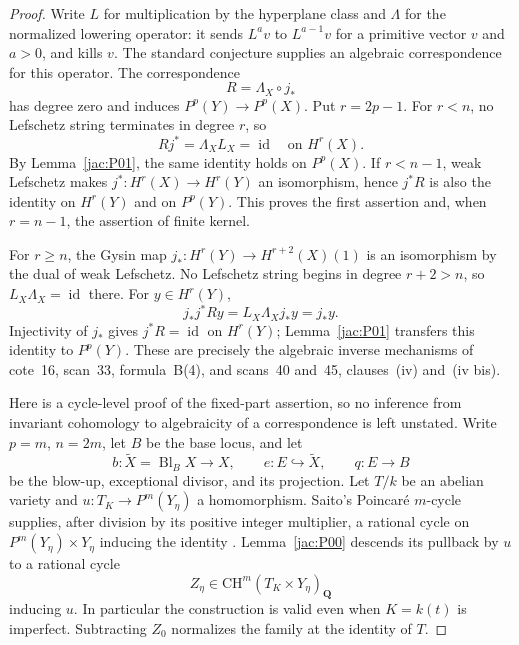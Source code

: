 \begin{proof}
Write $L$ for multiplication by the hyperplane class and $\Lambda$
for the normalized lowering operator: it sends $L^a v$ to
$L^{a-1}v$ for a primitive vector $v$ and $a>0$, and kills $v$.
The standard conjecture supplies an algebraic correspondence for this
operator.  The correspondence
\[
 R=\Lambda_X\circ j_*
\]
has degree zero and induces $P^p(Y)\to P^p(X)$.
Put $r=2p-1$.
For $r<n$, no Lefschetz string terminates in degree $r$, so
\[
 Rj^*=\Lambda_X L_X=\operatorname{id}\quad\text{on }H^r(X).
\]
By Lemma~\ref{jac:P01}, the same identity holds on $P^p(X)$.
If $r<n-1$, weak Lefschetz makes $j^*:H^r(X)\to H^r(Y)$ an
isomorphism, hence $j^*R$ is also the identity on $H^r(Y)$ and on
$P^p(Y)$.  This proves the first assertion and, when $r=n-1$,
the assertion of finite kernel.

For $r\ge n$, the Gysin map
$j_*:H^r(Y)\to H^{r+2}(X)(1)$ is an isomorphism by the dual of
weak Lefschetz.  No Lefschetz string begins in degree $r+2>n$,
so $L_X\Lambda_X=\operatorname{id}$ there.  For $y\in H^r(Y)$,
\[
 j_*j^*Ry=L_X\Lambda_Xj_*y=j_*y.
\]
Injectivity of $j_*$ gives $j^*R=\operatorname{id}$ on $H^r(Y)$;
Lemma~\ref{jac:P01} transfers this identity to $P^p(Y)$.
These are precisely the algebraic inverse mechanisms of cote~16,
scan~33, formula~B(4), and scans~40 and~45, clauses~(iv) and~(iv bis).

Here is a cycle-level proof of the fixed-part assertion, so no inference
from invariant cohomology to algebraicity of a correspondence is left
unstated.  Write $p=m$, $n=2m$, let $B$ be the base locus, and let
\[
 b:\widetilde X=\operatorname{Bl}_B X\longrightarrow X,
 \qquad e:E\hookrightarrow\widetilde X,
 \qquad q:E\longrightarrow B
\]
be the blow-up, exceptional divisor, and its projection.  Let $T/k$
be an abelian variety and
$u:T_K\longrightarrow P^m(Y_\eta)$ a homomorphism.  Saito's
Poincar\'e $m$-cycle supplies, after division by its positive integer
multiplier, a rational cycle on $P^m(Y_\eta)\times Y_\eta$
inducing the identity \cite[\S4.1]{Saito1979}.  Lemma~\ref{jac:P00}
descends its pullback by $u$ to a rational cycle
\[
 Z_\eta\in\mathrm{CH}^m(T_K\times Y_\eta)_{\mathbf Q}
\]
inducing $u$.  In particular the construction is valid even when
$K=k(t)$ is imperfect.  Subtracting $Z_0$ normalizes
the family at the identity of $T$.


\end{proof}
